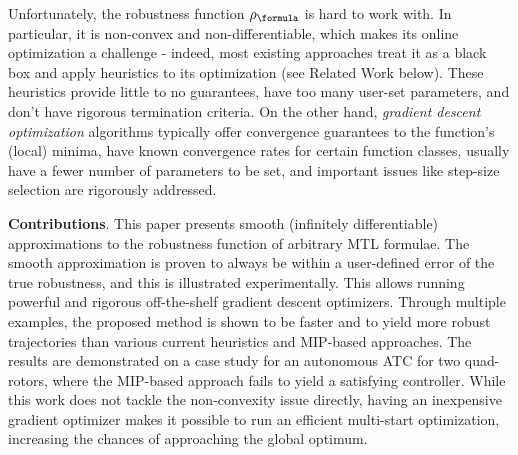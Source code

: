 Unfortunately, the robustness function $\robf$ is hard to work with.
In particular, it is non-convex and non-differentiable, which makes its online optimization a challenge - indeed, most existing approaches treat it as a black box and apply heuristics to its optimization (see Related Work below).
These heuristics provide little to no guarantees, have too many user-set parameters, and don't have rigorous termination criteria.
On the other hand, \textit{gradient descent optimization} algorithms typically offer convergence guarantees to the function's (local) minima, have known convergence rates for certain function classes, usually have a fewer number of parameters to be set, and important issues like step-size selection are rigorously addressed.

\textbf{Contributions}. This paper presents smooth (infinitely differentiable) approximations to the robustness function of arbitrary MTL formulae.
The smooth approximation is proven to always be within a user-defined error of the true robustness, and this is illustrated experimentally.
This allows running powerful and rigorous off-the-shelf gradient descent optimizers.
Through multiple examples, the proposed method is shown to be faster and to yield more robust trajectories than various current heuristics and MIP-based approaches. 
The results are demonstrated on a case study for an autonomous ATC for two quad-rotors, where the MIP-based approach fails to yield a satisfying controller.
While this work does not tackle the non-convexity issue directly, having an inexpensive gradient optimizer makes it possible to run an efficient multi-start optimization, increasing the chances of approaching the global optimum.

